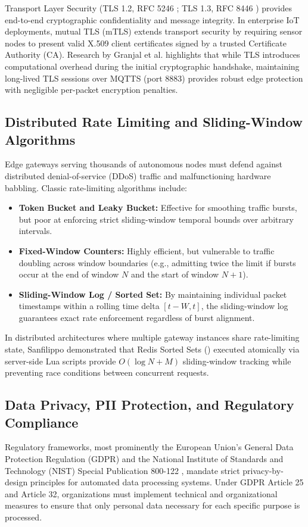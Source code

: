 \documentclass[a4paper]{article}
\begin{document}
Transport Layer Security (TLS 1.2, RFC 5246 \cite{rfc5246_tls}; TLS 1.3, RFC 8446 \cite{rfc8446_tls}) provides end-to-end cryptographic confidentiality and message integrity. In enterprise IoT deployments, mutual TLS (mTLS) extends transport security by requiring sensor nodes to present valid X.509 client certificates signed by a trusted Certificate Authority (CA). Research by Granjal et al. \cite{granjal2015security} highlights that while TLS introduces computational overhead during the initial cryptographic handshake, maintaining long-lived TLS sessions over MQTTS (port 8883) provides robust edge protection with negligible per-packet encryption penalties.

\subsection{Distributed Rate Limiting and Sliding-Window Algorithms}
Edge gateways serving thousands of autonomous nodes must defend against distributed denial-of-service (DDoS) traffic and malfunctioning hardware babbling. Classic rate-limiting algorithms include:
\begin{itemize}
    \item \textbf{Token Bucket and Leaky Bucket:} Effective for smoothing traffic bursts, but poor at enforcing strict sliding-window temporal bounds over arbitrary intervals.
    \item \textbf{Fixed-Window Counters:} Highly efficient, but vulnerable to traffic doubling across window boundaries (e.g., admitting twice the limit if bursts occur at the end of window $N$ and the start of window $N+1$).
    \item \textbf{Sliding-Window Log / Sorted Set:} By maintaining individual packet timestamps within a rolling time delta $[t - W, t]$, the sliding-window log guarantees exact rate enforcement regardless of burst alignment.
\end{itemize}
In distributed architectures where multiple gateway instances share rate-limiting state, Sanfilippo \cite{redis_ratelimit} demonstrated that Redis Sorted Sets () executed atomically via server-side Lua scripts provide $O(\log N + M)$ sliding-window tracking while preventing race conditions between concurrent requests.

\subsection{Data Privacy, PII Protection, and Regulatory Compliance}
Regulatory frameworks, most prominently the European Union's General Data Protection Regulation (GDPR) \cite{gdpr2016} and the National Institute of Standards and Technology (NIST) Special Publication 800-122 \cite{nist_sp800_122}, mandate strict privacy-by-design principles for automated data processing systems. Under GDPR Article 25 and Article 32, organizations must implement technical and organizational measures to ensure that only personal data necessary for each specific purpose is processed.
\end{document}
